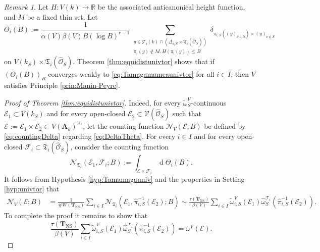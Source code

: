 \documentclass[11pt,letterpaper]{amsart}
\newcommand{\BR}{{\mathbb {R}}}
\newcommand{\CE}{{\mathcal {E}}}
\newcommand{\CF}{{\mathcal {F}}}
\newcommand{\CN}{{\mathcal {N}}}
\newcommand{\CO}{{\mathcal {O}}}
\newcommand{\CV}{{\mathcal {V}}}
\newcommand{\RA}{{\mathbf {A}}}
\newcommand{\CTUT}{\mathcal{T}}
\newcommand{\FTUT}{\mathfrak{T}}
\newcommand{\CTNS}{\mathbf{T}_{\operatorname{NS}}}
\theoremstyle{plain}
\numberwithin{equation}{section}
\theoremstyle{definition}
\theoremstyle{remark}
\newtheorem{remark}[theorem]{Remark}
\begin{document}
\begin{remark}
	Let $H:V(k)\to\BR$ be the associated anticanonical height function, and $M$ be a fixed thin set. Let
	\begin{equation}\label{eq:Thetai}
		\Theta_i(B):=\frac{1}{\alpha(V)\beta(V)B(\log B)^{r-1}}\sum_{\substack{y\in \CTUT_i(k)\cap (\varDelta_{i,S}\times\FTUT_i(\widehat{\CO}_S))\\\pi_i(y)\notin M, H(\pi_i(y))\leqslant B}}\delta_{\pi_{i,S}((y)_{\nu\in S})\times (y)_{\nu\notin S}}
	\end{equation} on $V(k_S)\times\FTUT_i(\widehat{\CO}_S)$. 
	Theorem \ref{thm:equidistunivtor} shows that if $(\Theta_i(B))_B$ converges weakly to \eqref{eq:Tamagamameaunivtor} for all $i\in I$, then $V$ satisfies Principle \ref{prin:Manin-Peyre}.
\end{remark}
\begin{proof}[Proof of Theorem \ref{thm:equidistunivtor}]
	 Indeed, for every $\widetilde{\omega}_S^V$-continuous $\CE_1\subset V(k_S)$ and for every open-closed $\CE_2\subset \CV(\widehat{\CO}_S)$ such that $\CE:=\CE_1\times\CE_2\subset V(\RA_k)^{\operatorname{Br}}$, let the counting function  $\CN_{V}(\CE;B)$ be defined by \eqref{eq:countingDelta} regarding \eqref{eq:DeltaTheta}. For every $i\in I$ and for every open-closed $\CF_i\subset \FTUT_i(\widehat{\CO}_S)$, consider the counting function  \begin{equation}\label{eq:UTcounting}
	\CN_{\FTUT_i}(\CE_1,\CF_i;B):=\int_{\CE\times\CF_i} \operatorname{d}\Theta_i(B).
	\end{equation}
	It follows from Hypothesis \ref{hyp:Tamamagauniv} and the properties in  Setting \ref{hyp:univtor} that 
	\begin{align*}
		\CN_{V}(\CE;B)&=\frac{1}{\# W(\CTNS)}\sum_{i\in I}\CN_{\FTUT_i}(\CE_1,\widehat{\pi}_{i,S}^{-1}(\CE_2);B)\sim \frac{\tau(\CTNS)}{\beta(V)}\sum_{i\in I}\widetilde{\omega}_{i,S}^V\left(\CE_1\right) \widehat{\omega}_S^{\CTUT_i}(\widehat{\pi}_{i,S}^{-1}(\CE_2)).	\end{align*} 
	To complete the proof it remains to show that
	\begin{equation}\label{eq:Ono0}
		\frac{\tau(\CTNS)}{\beta(V)}\sum_{i\in I}\widetilde{\omega}_{i,S}^V\left(\CE_1\right) \widehat{\omega}_S^{\CTUT_i}(\widehat{\pi}_{i,S}^{-1}(\CE_2))=\omega^V(\CE).
	\end{equation}
	

\end{proof}
\end{document}
